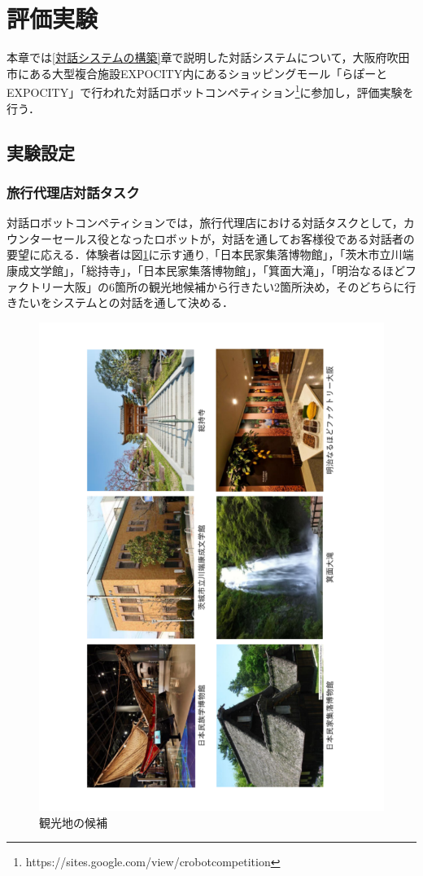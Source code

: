 \section{評価実験}
\label{評価実験}

本章では\ref{対話システムの構築}章で説明した対話システムについて，大阪府吹田市にある大型複合施設EXPOCITY内にあるショッピングモール「らぽーとEXPOCITY」で行われた対話ロボットコンペティション\footnote{https://sites.google.com/view/crobotcompetition}に参加し，評価実験を行う．

\subsection{実験設定}

\subsubsection{旅行代理店対話タスク}
対話ロボットコンペティションでは，旅行代理店における対話タスクとして，カウンターセールス役となったロボットが，対話を通してお客様役である対話者の要望に応える．体験者は図\ref{6place}に示す通り,「日本民家集落博物館」，「茨木市立川端康成文学館」，「総持寺」，「日本民家集落博物館」，「箕面大滝」，「明治なるほどファクトリー大阪」の6箇所の観光地候補から行きたい2箇所決め，そのどちらに行きたいをシステムとの対話を通して決める．
\begin{figure}[th]
    \centering
    \includegraphics[scale=0.5,angle=270]{pic/6place.pdf}
    \caption{観光地の候補}
    \label{6place}
\end{figure}

